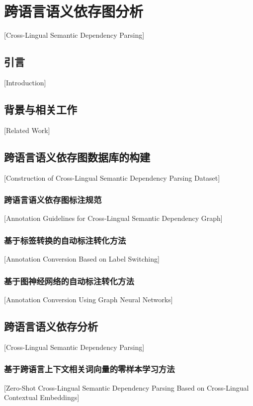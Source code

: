 
\chapter[跨语言语义依存图分析]{跨语言语义依存图分析}[Cross-Lingual Semantic Dependency Parsing]

\section{引言}[Introduction]

\section{背景与相关工作}[Related Work]

\section{跨语言语义依存图数据库的构建}[Construction of Cross-Lingual Semantic Dependency Parsing Dataset]

\subsection{跨语言语义依存图标注规范}[Annotation Guidelines for Cross-Lingual Semantic Dependency Graph]

\subsection{基于标签转换的自动标注转化方法}[Annotation Conversion Based on Label Switching]

\subsection{基于图神经网络的自动标注转化方法}[Annotation Conversion Using Graph Neural Networks]

\section{跨语言语义依存分析}[Cross-Lingual Semantic Dependency Parsing]

\subsection{基于跨语言上下文相关词向量的零样本学习方法}[Zero-Shot Cross-Lingual Semantic Dependency Parsing Based on Cross-Lingual Contextual Embeddings]

